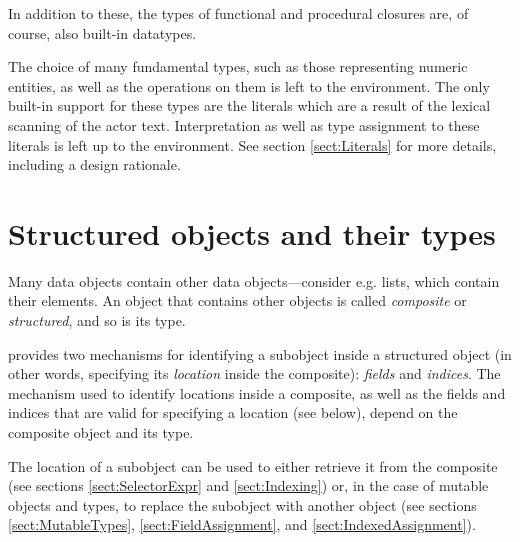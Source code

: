 In addition to these, the types of functional and procedural closures
are, of course, also built-in datatypes.
     
The choice of many fundamental types, such as those representing
numeric entities, as well as the operations on them is left to the
environment. The only built-in support for these types are the
literals which are a result of the lexical scanning of the actor text.
Interpretation as well as type assignment to these literals is left up
to the environment. See section \ref{sect:Literals} for more details,
including a design rationale.


\pagebreak[4]

\section{Structured objects and their
  types}\label{sect:StructuredTypes}


Many data objects contain other data objects---consider e.g. lists,
which contain their elements. An object that contains other objects
is called {\em composite} or {\em
  structured}, and so is its type.  


\Cal provides two mechanisms for identifying a subobject inside a
structured object (in other words, specifying its {\em location}
inside the composite): {\em fields} and {\em indices}. The mechanism
used to identify locations inside a composite, as well as the fields
and indices  that are valid for specifying a location (see below),
depend on the composite object and its type. 

The location of a subobject can be used to either retrieve it from the
composite (see sections \ref{sect:SelectorExpr} and
\ref{sect:Indexing}) or, in the case of mutable objects and types, to
replace the subobject with another object (see sections
\ref{sect:MutableTypes}, \ref{sect:FieldAssignment}, and
\ref{sect:IndexedAssignment}).

